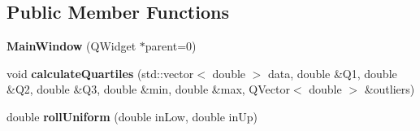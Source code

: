 \subsection*{Public Member Functions}
\begin{DoxyCompactItemize}
\item 
\hypertarget{classMainWindow_a8b244be8b7b7db1b08de2a2acb9409db}{}{\bfseries Main\+Window} (Q\+Widget $\ast$parent=0)\label{classMainWindow_a8b244be8b7b7db1b08de2a2acb9409db}

\item 
\hypertarget{classMainWindow_ac686d9af408fec710cd42955c43c845c}{}void {\bfseries calculate\+Quartiles} (std\+::vector$<$ double $>$ data, double \&Q1, double \&Q2, double \&Q3, double \&min, double \&max, Q\+Vector$<$ double $>$ \&outliers)\label{classMainWindow_ac686d9af408fec710cd42955c43c845c}

\item 
\hypertarget{classMainWindow_a7a4f624daccfc6abe3868b0ba93a03b2}{}double {\bfseries roll\+Uniform} (double in\+Low, double in\+Up)\label{classMainWindow_a7a4f624daccfc6abe3868b0ba93a03b2}

\end{DoxyCompactItemize}
